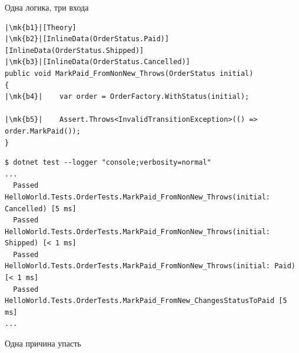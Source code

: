 \documentclass[aspectratio=169,10pt,t]{beamer}
\newcommand{\codexs}{\ttfamily\fontsize{7.0}{8.3}\selectfont}
\newcommand{\termsm}{\ttfamily\fontsize{6.6}{7.9}\selectfont}
\newcommand{\mk}[1]{\tikz[remember picture,overlay]\coordinate (#1) at (0,0.55ex);}
\begin{document}
\begin{frame}[fragile]{Одна логика, три входа}
\begin{lstlisting}[style=csharp,basicstyle=\codexs,escapechar=|]
|\mk{b1}|[Theory]
|\mk{b2}|[InlineData(OrderStatus.Paid)]
[InlineData(OrderStatus.Shipped)]
|\mk{b3}|[InlineData(OrderStatus.Cancelled)]
public void MarkPaid_FromNonNew_Throws(OrderStatus initial)
{
|\mk{b4}|    var order = OrderFactory.WithStatus(initial);

|\mk{b5}|    Assert.Throws<InvalidTransitionException>(() => order.MarkPaid());
}
\end{lstlisting}

\begin{lstlisting}[style=term,basicstyle=\termsm]
$ dotnet test --logger "console;verbosity=normal"
...
  Passed HelloWorld.Tests.OrderTests.MarkPaid_FromNonNew_Throws(initial: Cancelled) [5 ms]
  Passed HelloWorld.Tests.OrderTests.MarkPaid_FromNonNew_Throws(initial: Shipped) [< 1 ms]
  Passed HelloWorld.Tests.OrderTests.MarkPaid_FromNonNew_Throws(initial: Paid) [< 1 ms]
  Passed HelloWorld.Tests.OrderTests.MarkPaid_FromNew_ChangesStatusToPaid [5 ms]
...
\end{lstlisting}
\end{frame}

\begin{frame}[plain]
\end{frame}

\begin{frame}{Одна причина упасть}
  \slidetop

  \slidegap
\end{frame}
\end{document}
